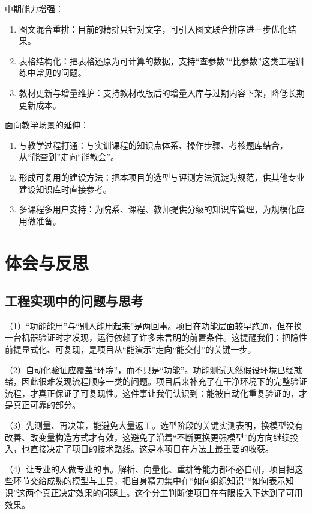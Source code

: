 \documentclass[12pt,a4paper]{ctexart}
\begin{document}
中期能力增强：

\begin{enumerate}[leftmargin=2.4em,itemsep=3pt,start=4]
  \item 图文混合重排：目前的精排只针对文字，可引入图文联合排序进一步优化结果。
  \item 表格结构化：把表格还原为可计算的数据，支持“查参数”“比参数”这类工程训练中常见的问题。
  \item 教材更新与增量维护：支持教材改版后的增量入库与过期内容下架，降低长期更新成本。
\end{enumerate}

面向教学场景的延伸：

\begin{enumerate}[leftmargin=2.4em,itemsep=3pt,start=7]
  \item 与教学过程打通：与实训课程的知识点体系、操作步骤、考核题库结合，从“能查到”走向“能教会”。
  \item 形成可复用的建设方法：把本项目的选型与评测方法沉淀为规范，供其他专业建设知识库时直接参考。
  \item 多课程多用户支持：为院系、课程、教师提供分级的知识库管理，为规模化应用做准备。
\end{enumerate}

\section{体会与反思}

\subsection{工程实现中的问题与思考}

（1）“功能能用”与“别人能用起来”是两回事。项目在功能层面较早跑通，但在换一台机器验证时才发现，运行依赖了许多未言明的前置条件。这提醒我们：把隐性前提显式化、可复现，是项目从“能演示”走向“能交付”的关键一步。

（2）自动化验证应覆盖“环境”，而不只是“功能”。功能测试天然假设环境已经就绪，因此很难发现流程顺序一类的问题。项目后来补充了在干净环境下的完整验证流程，才真正保证了可复现性。这件事让我们认识到：能被自动化重复验证的，才是真正可靠的部分。

（3）先测量、再决策，能避免大量返工。选型阶段的关键实测表明，换模型没有改善、改变量构造方式才有效，这避免了沿着“不断更换更强模型”的方向继续投入，也直接决定了项目的技术路线。这是本项目在方法上最重要的收获。

（4）让专业的人做专业的事。解析、向量化、重排等能力都不必自研，项目把这些环节交给成熟的模型与工具，把自身精力集中在“如何组织知识”“如何表示知识”这两个真正决定效果的问题上。这个分工判断使项目在有限投入下达到了可用效果。
\end{document}
